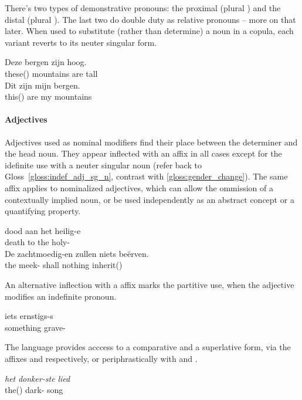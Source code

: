There's two types of demonstrative pronouns: the proximal  (plural ) and the distal  (plural ).
The last two do double duty as relative pronouns -- more on that later.
When used to substitute (rather than determine) a noun in a copula, each variant reverts to its neuter singular form.
\begin{exe}
\ex
\begin{xlist}
\ex
\gll Deze bergen zijn hoog.\\
these() mountains are tall\\
\ex
\gll Dit zijn mijn bergen.\\
this() are my mountains\\
\end{xlist}
\end{exe}

\paragraph{Adjectives}
Adjectives used as nominal modifiers find their place between the determiner and the head noun.
They appear inflected with an  affix in all cases except for the idefinite use with a neuter singular noun (refer back to Gloss~\ref{gloss:indef_adj_sg_n}, contrast with \ref{gloss:gender_change}).
The same affix applies to nominalized adjectives, which can allow the ommission of a contextually implied noun, or be used independently as an abstract concept or a quantifying property.
\begin{exe}
\ex
\gll dood aan het heilig-e\\
death to the holy-\\
\ex
\gll De zachtmoedig-en zullen niets be\"{e}rven.\\
the meek- shall nothing inherit()\\
\end{exe}
An alternative inflection with a  affix marks the partitive use, when the adjective modifies an indefinite pronoun.
\begin{exe}
\ex
\gll iets ernstigs-s\\
something grave-\\
\end{exe}
The language provides acccess to a comparative and a superlative form, via the affixes  and  respectively, or periphrastically with  and .
\begin{exe}
\ex
\gll \textit{het} \textit{donker-ste} \textit{lied}\\
the() dark- song\\
\end{exe}

